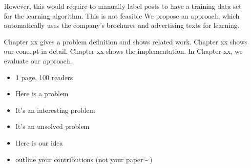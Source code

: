However, this would require to manually label posts to have a training data set for the learning algorithm.
This is not feasible
We propose an approach, which automatically uses the company's brochures and advertising texts for learning.

Chapter xx gives a problem definition and shows related work.
Chapter xx shows our concept in detail.
Chapter xx shows the implementation.
In Chapter xx, we evaluate our approach.

\begin{itemize}
	\item 1 page, 100 readers
	\item Here is a problem
	\item It's an interesting problem
	\item It's an unsolved problem
	\item Here is our idea
	\item outline your contributions (not your paper$\ddot\smile$)
\end{itemize}
